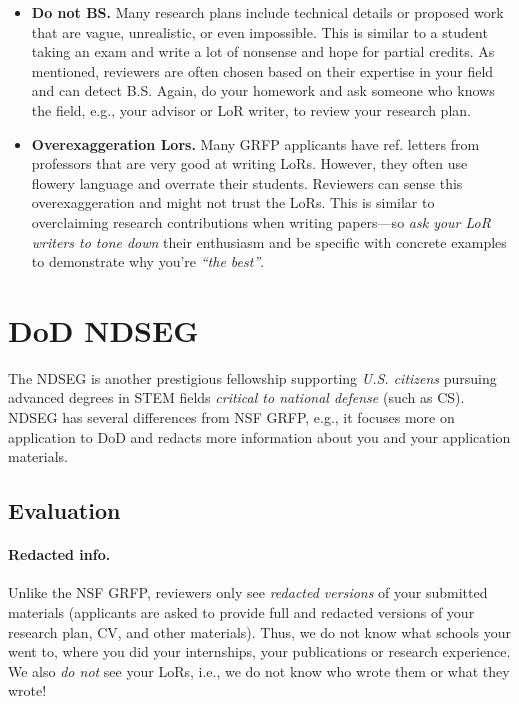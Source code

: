\documentclass[oneside,11pt]{book}
\begin{document}
\begin{itemize}
\item \textbf{Do not BS.} Many research plans include technical details or proposed work that are vague, unrealistic, or even impossible. This is similar to a student taking an exam and write a lot of nonsense and hope for partial credits.  As mentioned, reviewers are often chosen based on their expertise in your field and can detect B.S. Again, do your homework and ask someone who knows the field, e.g., your advisor or LoR writer, to review your research plan.


\item \textbf{Overexaggeration Lors.} Many GRFP applicants have ref. letters from professors that are very good at writing LoRs. However, they often use flowery language and overrate their students. Reviewers can sense this overexaggeration and might not trust the LoRs. This is similar to overclaiming research contributions when writing papers---so \emph{ask your LoR writers to tone down} their enthusiasm and be specific with concrete examples to demonstrate why you're \emph{``the best''}. 



\end{itemize}


\section{DoD NDSEG}\label{sec:dod-ndseg}

The NDSEG is another prestigious fellowship supporting \emph{U.S. citizens} pursuing advanced degrees in STEM fields \emph{critical to national defense} (such as CS). NDSEG has several differences from NSF GRFP, e.g., it  focuses more on application to DoD and redacts more information about you and your application materials. 
\subsection{Evaluation}

\paragraph{Redacted info.} Unlike the NSF GRFP, reviewers only see \emph{redacted versions} of your submitted materials (applicants are asked to provide full and redacted versions of your research plan, CV, and other materials). Thus, we do not know what schools your went to, where you did your internships, your publications or research experience. We also \emph{do not} see your LoRs, i.e., we do not know who wrote them or what they wrote! 
\end{document}
